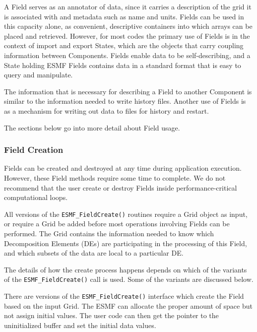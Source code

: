

A Field serves as an annotator of data, since it carries 
a description of the grid it is associated with and metadata 
such as name and units.  Fields can be used in this capacity
alone, as convenient, descriptive containers into which arrays 
can be placed and retrieved.  However, for most codes the primary 
use of Fields is in the context of import and export States,
which are the objects that carry coupling information between 
Components.  Fields enable data to be self-describing, and a
State holding ESMF Fields contains data in a standard format
that is easy to query and manipulate.  

The information that is necessary for describing a Field to 
another Component is similar to the information needed to write 
history files.  Another use of Fields is as a mechanism for 
writing out data to files for history and restart.

The sections below go into more detail about Field usage.

\subsubsection{Field Creation}

Fields can be created and destroyed at any time during 
application execution.  However, these Field methods require 
some time to complete.  We do not recommend that the user
create or destroy Fields inside performance-critical 
computational loops.

All versions of the {\tt ESMF\_FieldCreate()} 
routines require a Grid object as input, or require a Grid
be added before most operations involving Fields can be performed.
The Grid contains the information needed to know which 
Decomposition Elements (DEs) are participating in 
the processing of this Field, and which subsets of the data
are local to a particular DE.

The details of how the create process happens depends 
on which of the variants of the {\tt ESMF\_FieldCreate()} 
call is used.  Some of the variants are discussed below.

There are versions of the {\tt ESMF\_FieldCreate()} interface
which create the Field based on the input Grid.  The ESMF
can allocate the proper amount of 
space but not assign initial values.  The user code
can then get the pointer to the uninitialized buffer and 
set the initial data values.

